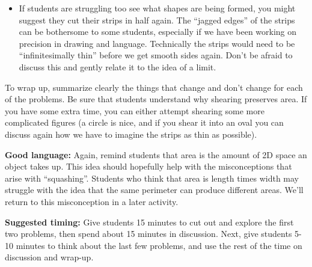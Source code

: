 \documentclass[nooutcomes,noauthor, handout]{ximera}
\begin{document}
\begin{instructorNotes}
\begin{itemize}
	\item If students are struggling too see what shapes are being formed, you might suggest they cut their strips in half again. The ``jagged edges'' of the strips can be bothersome to some students, especially if we have been working on precision in drawing and language. Technically the strips would need to be ``infinitesimally thin'' before we get smooth sides again. Don't be afraid to discuss this and gently relate it to the idea of a limit. 

\end{itemize}

To wrap up, summarize clearly the things that change and don't change for each of the problems. Be sure that students understand why shearing preserves area. If you have some extra time, you can either attempt shearing some more complicated figures (a circle is nice, and if you shear it into an oval you can discuss again how we have to imagine the strips as thin as possible). 





{\bf Good language:} Again, remind students that area is the amount of 2D space an object takes up. This idea should hopefully help with the misconceptions that arise with ``squashing''. Students who think that area is length times width may struggle with the idea that the same perimeter can produce different areas. We'll return to this misconception in a later activity.



{\bf Suggested timing:} Give students 15 minutes to cut out and explore the first two problems, then spend about 15 minutes in discussion. Next, give students 5-10 minutes to think about the last few problems, and use the rest of the time on discussion and wrap-up.




\end{instructorNotes}
\end{document}
